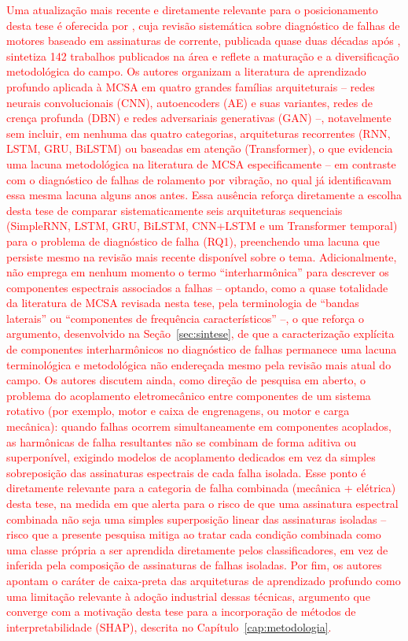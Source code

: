 \documentclass[times,final]{elsarticle}
\begin{document}
\textcolor{red}{Uma atualização mais recente e diretamente relevante para o posicionamento desta tese é oferecida por \citet{niu2023}, cuja revisão sistemática sobre diagnóstico de falhas de motores baseado em assinaturas de corrente, publicada quase duas décadas após \citet{nandi2005}, sintetiza 142 trabalhos publicados na área e reflete a maturação e a diversificação metodológica do campo. Os autores organizam a literatura de aprendizado profundo aplicada à MCSA em quatro grandes famílias arquiteturais -- redes neurais convolucionais (CNN), autoencoders (AE) e suas variantes, redes de crença profunda (DBN) e redes adversariais generativas (GAN) --, notavelmente sem incluir, em nenhuma das quatro categorias, arquiteturas recorrentes (RNN, LSTM, GRU, BiLSTM) ou baseadas em atenção (Transformer), o que evidencia uma lacuna metodológica na literatura de MCSA especificamente -- em contraste com o diagnóstico de falhas de rolamento por vibração, no qual \citet{hoang2019} já identificavam essa mesma lacuna alguns anos antes. Essa ausência reforça diretamente a escolha desta tese de comparar sistematicamente seis arquiteturas sequenciais (SimpleRNN, LSTM, GRU, BiLSTM, CNN+LSTM e um Transformer temporal) para o problema de diagnóstico de falha (RQ1), preenchendo uma lacuna que persiste mesmo na revisão mais recente disponível sobre o tema. Adicionalmente, \citet{niu2023} não emprega em nenhum momento o termo ``interharmônica'' para descrever os componentes espectrais associados a falhas -- optando, como a quase totalidade da literatura de MCSA revisada nesta tese, pela terminologia de ``bandas laterais'' ou ``componentes de frequência característicos'' --, o que reforça o argumento, desenvolvido na Seção~\ref{sec:sintese}, de que a caracterização explícita de componentes interharmônicos no diagnóstico de falhas permanece uma lacuna terminológica e metodológica não endereçada mesmo pela revisão mais atual do campo. Os autores discutem ainda, como direção de pesquisa em aberto, o problema do acoplamento eletromecânico entre componentes de um sistema rotativo (por exemplo, motor e caixa de engrenagens, ou motor e carga mecânica): quando falhas ocorrem simultaneamente em componentes acoplados, as harmônicas de falha resultantes não se combinam de forma aditiva ou superponível, exigindo modelos de acoplamento dedicados em vez da simples sobreposição das assinaturas espectrais de cada falha isolada. Esse ponto é diretamente relevante para a categoria de falha combinada (mecânica + elétrica) desta tese, na medida em que alerta para o risco de que uma assinatura espectral combinada não seja uma simples superposição linear das assinaturas isoladas -- risco que a presente pesquisa mitiga ao tratar cada condição combinada como uma classe própria a ser aprendida diretamente pelos classificadores, em vez de inferida pela composição de assinaturas de falhas isoladas. Por fim, os autores apontam o caráter de caixa-preta das arquiteturas de aprendizado profundo como uma limitação relevante à adoção industrial dessas técnicas, argumento que converge com a motivação desta tese para a incorporação de métodos de interpretabilidade (SHAP), descrita no Capítulo~\ref{cap:metodologia}.}
\end{document}
